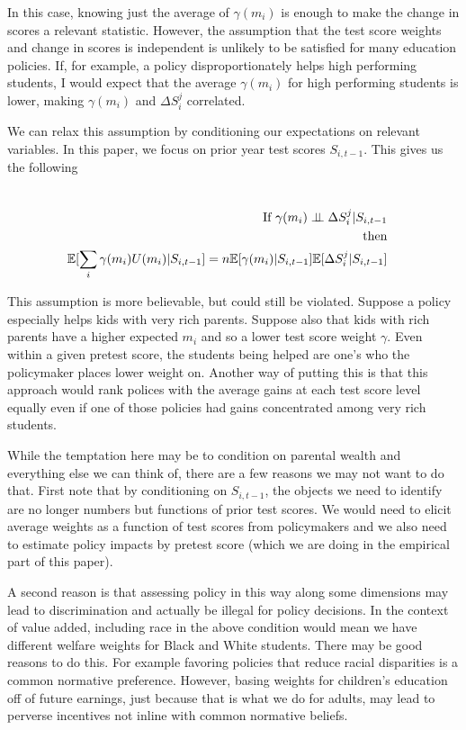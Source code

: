 \documentclass{article}
\theoremstyle{definition}
\theoremstyle{definition}
\theoremstyle{definition}
\begin{document}
\normalsize
In this case, knowing just the average of $\gamma(m_i)$ is enough to make the change in scores a relevant statistic. However, the assumption that the test score weights and change in scores is independent is unlikely to be satisfied for many education policies. If, for example, a policy disproportionately helps high performing students, I would expect that the average $\gamma(m_i)$ for high performing students is lower, making $\gamma(m_i)$  and $\Delta S_i^j$ correlated. 

We can relax this assumption by conditioning our expectations on relevant variables. In this paper, we focus on prior year test scores $S_{i,t-1}$. This gives us the following 

\large
\begin{align*}

   \\ \text{If  }   \gamma(m_i) \indep \Delta S_i^j | S_{i,t-1} &
    \\ \text{then} &
   \\ \E[\sum_i \gamma(m_i)U(m_i)| S_{i,t-1}]= n\E[\gamma(m_i)|S_{i,t-1}]\E[\Delta S_i^j|S_{i,t-1}] &
\end{align*}
\normalsize

This assumption is more believable, but could still be violated. Suppose a policy especially helps kids with very rich parents. Suppose also that kids with rich parents have a higher expected $m_i$ and so a lower test score weight $\gamma$. Even within a given pretest score, the students being helped are one's who the policymaker places lower weight on. Another way of putting this is that this approach would rank polices with the average gains at each test score level equally even if one of those policies had gains concentrated among very rich students. 

While the temptation here may be to condition on parental wealth and everything else we can think of, there are a few reasons we may not want to do that. First note that by conditioning on $S_{i,t-1}$, the objects we need to identify are no longer numbers but functions of prior test scores. We would need to elicit average weights as a function of test scores from policymakers and we also need to estimate policy impacts by pretest score (which we are doing in the empirical part of this paper). 

A second reason is that assessing policy in this way along some dimensions may lead to discrimination and actually be illegal for policy decisions. In the context of value added, including race in the above condition would mean we have different welfare weights for Black and White students. There may be good reasons to do this. For example favoring policies that reduce racial disparities is a common normative preference. However, basing weights for children's education off of future earnings, just because that is what we do for adults, may lead to perverse incentives not inline with common normative beliefs.   
\end{document}
